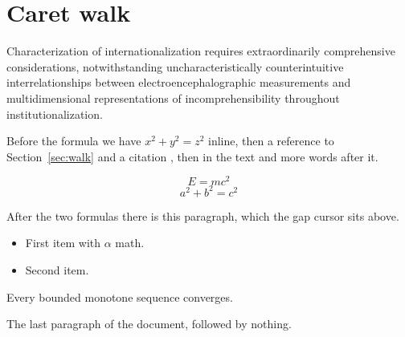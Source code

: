 \documentclass{article}
\begin{document}
\section{Caret walk}

Characterization of internationalization requires extraordinarily comprehensive considerations, notwithstanding uncharacteristically counterintuitive interrelationships between electroencephalographic measurements and multidimensional representations of incomprehensibility throughout institutionalization.

Before the formula we have $x^2 + y^2 = z^2$ inline, then a reference to Section~\ref{sec:walk} and a citation \cite{knuth1984}, then  in the text and more words after it.

\begin{equation}
E = mc^2
\end{equation}
\begin{equation}
a^2 + b^2 = c^2
\end{equation}

After the two formulas there is this paragraph, which the gap cursor sits above.

\begin{itemize}
\item First item with $\alpha$ math.
\item Second item.
\end{itemize}

\begin{theorem}
Every bounded monotone sequence converges.
\end{theorem}

The last paragraph of the document, followed by nothing.
\end{document}
